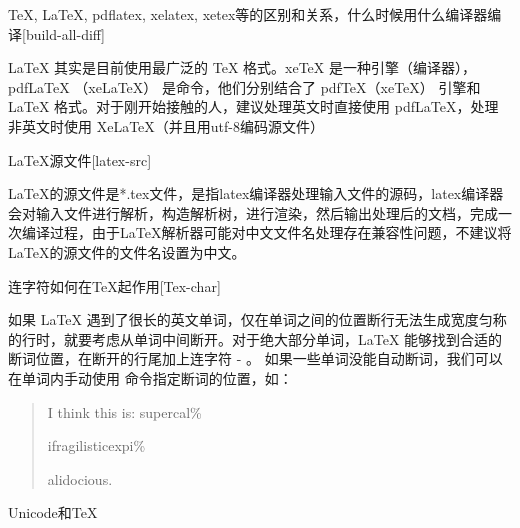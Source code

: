 \begin{faq}{\TeX{}, \LaTeX{}, pdflatex, xelatex, xetex等的区别和关系，什么时候用什么编译器编译}[build-all-diff]

  LaTeX 其实是目前使用最广泛的 \TeX{} 格式。xeTeX 是一种引擎（编译器），pdfLaTeX （xeLaTeX） 是命令，他们分别结合了 pdfTeX（xeTeX） 引擎和 \LaTeX{} 格式。对于刚开始接触的人，建议处理英文时直接使用 pdfLaTeX，处理非英文时使用 XeLaTeX（并且用utf-8编码源文件） 

\end{faq}

\begin{faq}{\LaTeX{}源文件}[latex-src]

  LaTeX的源文件是*.tex文件，是指latex编译器处理输入文件的源码，latex编译器会对输入文件进行解析，构造解析树，进行渲染，然后输出处理后的文档，完成一次编译过程，由于LaTeX解析器可能对中文文件名处理存在兼容性问题，不建议将LaTeX的源文件的文件名设置为中文。

\end{faq}

\begin{faq}{连字符如何在\TeX{}起作用}[Tex-char]

  如果 LaTeX 遇到了很长的英文单词，仅在单词之间的位置断行无法生成宽度匀称的行时，就要考虑从单词中间断开。对于绝大部分单词，LaTeX 能够找到合适的断词位置，在断开的行尾加上连字符 - 。
  如果一些单词没能自动断词，我们可以在单词内手动使用 \- 命令指定断词的位置，如：
  
  \begin{quote}
  I think this is: su\-per\-cal\-\%
  
  i\-frag\-i\-lis\-tic\-ex\-pi\-\%
  
  al\-i\-do\-cious.
  \end{quote}

\end{faq}

\begin{faq}{Unicode和\TeX{}}
\end{faq}

